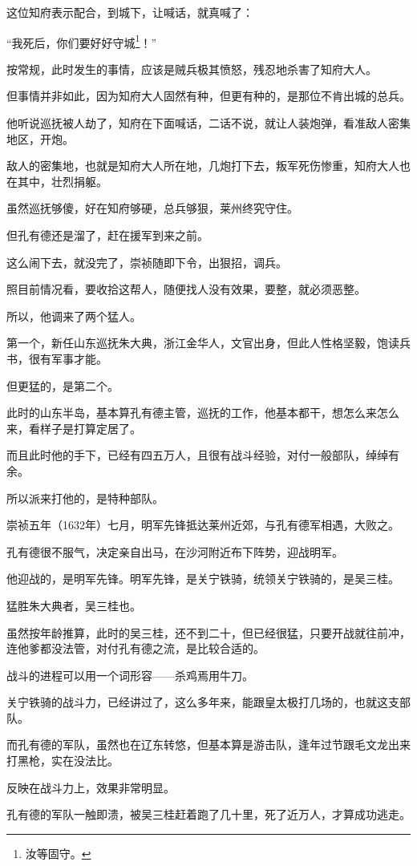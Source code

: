 \begin{multicols}{\theparacolNo}
这位知府表示配合，到城下，让喊话，就真喊了：

“我死后，你们要好好守城\footnote{汝等固守。}！”

按常规，此时发生的事情，应该是贼兵极其愤怒，残忍地杀害了知府大人。

但事情并非如此，因为知府大人固然有种，但更有种的，是那位不肯出城的总兵。

他听说巡抚被人劫了，知府在下面喊话，二话不说，就让人装炮弹，看准敌人密集地区，开炮。

敌人的密集地，也就是知府大人所在地，几炮打下去，叛军死伤惨重，知府大人也在其中，壮烈捐躯。

虽然巡抚够傻，好在知府够硬，总兵够狠，莱州终究守住。

但孔有德还是溜了，赶在援军到来之前。

这么闹下去，就没完了，崇祯随即下令，出狠招，调兵。

照目前情况看，要收拾这帮人，随便找人没有效果，要整，就必须恶整。

所以，他调来了两个猛人。

第一个，新任山东巡抚朱大典，浙江金华人，文官出身，但此人性格坚毅，饱读兵书，很有军事才能。

但更猛的，是第二个。

此时的山东半岛，基本算孔有德主管，巡抚的工作，他基本都干，想怎么来怎么来，看样子是打算定居了。

而且此时他的手下，已经有四五万人，且很有战斗经验，对付一般部队，绰绰有余。

所以派来打他的，是特种部队。

崇祯五年（1632年）七月，明军先锋抵达莱州近郊，与孔有德军相遇，大败之。

孔有德很不服气，决定亲自出马，在沙河附近布下阵势，迎战明军。

他迎战的，是明军先锋。明军先锋，是关宁铁骑，统领关宁铁骑的，是吴三桂。

猛胜朱大典者，吴三桂也。

虽然按年龄推算，此时的吴三桂，还不到二十，但已经很猛，只要开战就往前冲，连他爹都没法管，对付孔有德之流，是比较合适的。

战斗的进程可以用一个词形容——杀鸡焉用牛刀。

关宁铁骑的战斗力，已经讲过了，这么多年来，能跟皇太极打几场的，也就这支部队。

而孔有德的军队，虽然也在辽东转悠，但基本算是游击队，逢年过节跟毛文龙出来打黑枪，实在没法比。

反映在战斗力上，效果非常明显。

孔有德的军队一触即溃，被吴三桂赶着跑了几十里，死了近万人，才算成功逃走。


\end{multicols}
